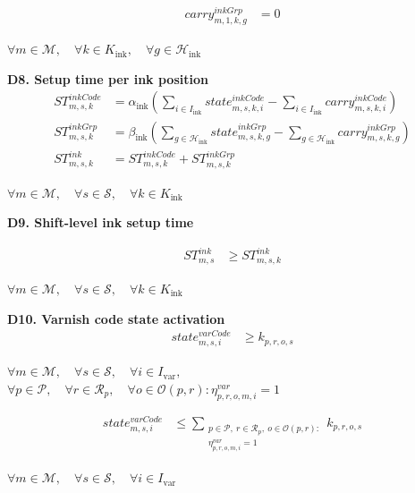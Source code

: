 \documentclass{article}
\begin{document}
\begin{align}
carry^{inkGrp}_{m,1,k,g}
&=
0
\label{eq:D7_ink_group_carry_initial}
\end{align}
\begin{center}
$\forall m \in \mathcal{M}, \quad
\forall k \in K_{\text{ink}}, \quad
\forall g \in \mathcal{H}_{\text{ink}}$
\end{center}
\noindent\textbf{D8. Setup time per ink position}
\begin{align}
ST^{inkCode}_{m,s,k}
&=
\alpha_{\text{ink}}
\left(
\sum_{i \in I_{\text{ink}}}
state^{inkCode}_{m,s,k,i}
-
\sum_{i \in I_{\text{ink}}}
carry^{inkCode}_{m,s,k,i}
\right)
\label{eq:D8_ink_code_time}
\\
ST^{inkGrp}_{m,s,k}
&=
\beta_{\text{ink}}
\left(
\sum_{g \in \mathcal{H}_{\text{ink}}}
state^{inkGrp}_{m,s,k,g}
-
\sum_{g \in \mathcal{H}_{\text{ink}}}
carry^{inkGrp}_{m,s,k,g}
\right)
\label{eq:D8_ink_group_time}
\\
ST^{ink}_{m,s,k}
&=
ST^{inkCode}_{m,s,k}
+
ST^{inkGrp}_{m,s,k}
\label{eq:D8_ink_position_time}
\end{align}
\begin{center}
$\forall m \in \mathcal{M}, \quad
\forall s \in \mathcal{S}, \quad
\forall k \in K_{\text{ink}}$
\end{center}

\noindent\textbf{D9. Shift-level ink setup time}

\begin{align}
ST^{ink}_{m,s}
&\ge
ST^{ink}_{m,s,k}
\label{eq:D9_ink_shift_time}
\end{align}

\begin{center}
$\forall m \in \mathcal{M}, \quad
\forall s \in \mathcal{S}, \quad
\forall k \in K_{\text{ink}}$
\end{center}


\noindent\textbf{D10. Varnish code state activation}
\begin{align}
state^{varCode}_{m,s,i}
&\ge
k_{p,r,o,s}
\label{eq:D10_var_code_state_lb}
\end{align}
\begin{center}
$\forall m \in \mathcal{M}, \quad
\forall s \in \mathcal{S}, \quad
\forall i \in I_{\text{var}},$
\\
$\forall p \in \mathcal{P}, \quad
\forall r \in \mathcal{R}_p, \quad
\forall o \in \mathcal{O}(p,r):
\eta^{var}_{p,r,o,m,i}=1$
\end{center}

\begin{align}
state^{varCode}_{m,s,i}
&\le
\sum_{\substack{
p \in \mathcal{P},\ r \in \mathcal{R}_p,\ o \in \mathcal{O}(p,r):\\
\eta^{var}_{p,r,o,m,i}=1
}}
k_{p,r,o,s}
\label{eq:D10_var_code_state_ub}
\end{align}
\begin{center}
$\forall m \in \mathcal{M}, \quad
\forall s \in \mathcal{S}, \quad
\forall i \in I_{\text{var}}$
\end{center}
\end{document}
